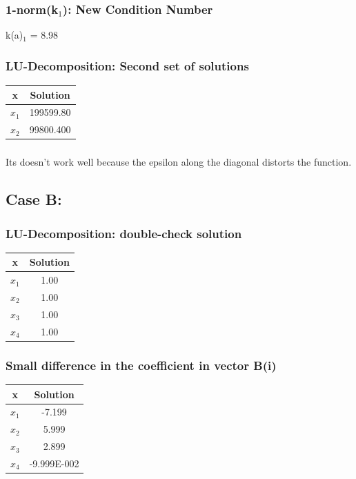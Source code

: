 \documentclass[twocolumn]{article}
\begin{document}
\subsubsection{1-norm(k$_1$): New Condition Number}
\newline
k(a)$_1$ =    8.98
\subsubsection{LU-Decomposition: Second set of solutions}

\begin{table}[H]
  \centering
  \begin{tabular}{|c|c|} \hline
x & Solution\\ \hline \hline
$x_1$ & 199599.80 \\ \hline
$x_2$ & 99800.400 \\ \hline
\end{tabular}
\end{table}
\newline
\subsubsection{}
Its doesn't work well because the epsilon along the diagonal distorts the function.

\subsection{Case B:}
\subsubsection{LU-Decomposition: double-check solution}
\begin{table}[H]
  \centering
  \begin{tabular}{|c|c|} \hline
x & Solution\\ \hline \hline
$x_1$ & 1.00 \\ \hline
$x_2$ & 1.00 \\ \hline
$x_3$ & 1.00 \\ \hline
$x_4$ & 1.00 \\ \hline
\end{tabular}
\centering
\end{table}

\subsubsection{Small difference in the coefficient in vector B(i)}
\begin{table}[H]
  \centering
  \begin{tabular}{|c|c|} \hline
x & Solution\\ \hline \hline
$x_1$ & -7.199 \\ \hline
$x_2$ &  5.999 \\ \hline
$x_3$ & 2.899  \\ \hline
$x_4$ & -9.999E-002 \\ \hline
\end{tabular}
\centering
\end{table}
\end{document}
